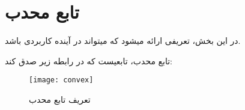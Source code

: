 \section{تابع محدب}
در این بخش، تعریفی ارائه میشود که میتواند در آینده کاربردی باشد.

تابع محدب، تابعیست که در رابطه زیر صدق کند:
\begin{figure}[!h]
	\centering
	\texttt{[image: convex]}
	
	\caption[تعریف تابع محدب]{
		تعریف تابع محدب
	}
\end{figure}
\newpage
‌